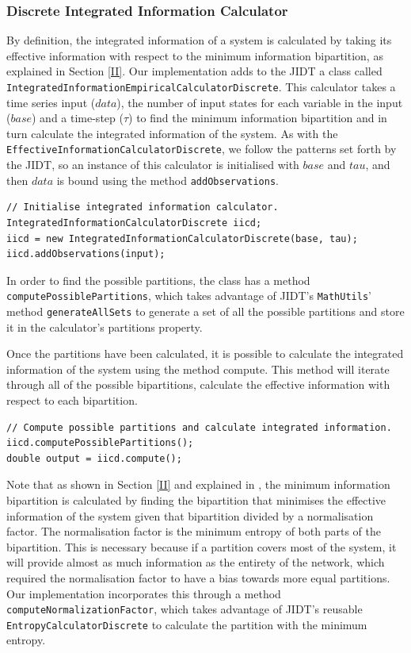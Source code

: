 \documentclass[a4paper,11pt]{article}
\begin{document}
\subsubsection{Discrete Integrated Information Calculator}
\label{sec:impl:ii:calculator}
By definition, the integrated information of a system is calculated by taking its effective information with respect to the minimum information bipartition, as explained in Section \ref{II}. Our implementation adds to the JIDT a class called \texttt{IntegratedInformationEmpiricalCalculatorDiscrete}. This calculator takes a time series input ($data$), the number of input states for each variable in the input ($base$) and a time-step ($\tau$) to find the minimum information bipartition and in turn calculate the integrated information of the system. As with the \texttt{EffectiveInformationCalculatorDiscrete}, we follow the patterns set forth by the JIDT, so an instance of this calculator is initialised with $base$ and $tau$, and then $data$ is bound using the method \texttt{addObservations}.

\begin{verbatim}
// Initialise integrated information calculator.
IntegratedInformationCalculatorDiscrete iicd;
iicd = new IntegratedInformationCalculatorDiscrete(base, tau);
iicd.addObservations(input);
\end{verbatim}

In order to find the possible partitions, the class has a method \texttt{computePossiblePartitions}, which takes advantage of JIDT's \texttt{MathUtils}' method \texttt{generateAllSets} to generate a set of all the possible partitions and store it in the calculator's partitions property.

Once the partitions have been calculated, it is possible to calculate the integrated information of the system using the method compute. This method will iterate through all of the possible bipartitions, calculate the effective information with respect to each bipartition.

\begin{verbatim}
// Compute possible partitions and calculate integrated information.
iicd.computePossiblePartitions();
double output = iicd.compute();
\end{verbatim}

Note that as shown in Section \ref{II} and explained in \cite{Barrett2011}, the minimum information bipartition is calculated by finding the bipartition that minimises the effective information of the system given that bipartition divided by a normalisation factor. The normalisation factor is the minimum entropy of both parts of the bipartition. This is necessary because if a partition covers most of the system, it will provide almost as much information as the entirety of the network, which required the normalisation factor to have a bias towards more equal partitions. Our implementation incorporates this through a method \texttt{computeNormalizationFactor}, which takes advantage of JIDT's reusable \texttt{EntropyCalculatorDiscrete} to calculate the partition with the minimum entropy.
\end{document}
